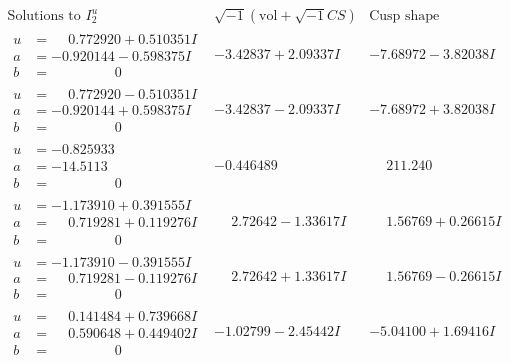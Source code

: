 \documentclass[1p]{elsarticle_modified}
\theoremstyle{definition}
\newcommand{\I}{\sqrt{-1}}
\begin{document}
$$\begin{array}{c|c|c}  
\text{Solutions to }I^u_{2}& \I (\text{vol} + \sqrt{-1}CS) & \text{Cusp shape}\\
 \hline 
\begin{aligned}
u &= \phantom{-}0.772920 + 0.510351 I \\
a &= -0.920144 - 0.598375 I \\
b &= \phantom{-0.000000 } 0\end{aligned}
 & -3.42837 + 2.09337 I & -7.68972 - 3.82038 I \\ \hline\begin{aligned}
u &= \phantom{-}0.772920 - 0.510351 I \\
a &= -0.920144 + 0.598375 I \\
b &= \phantom{-0.000000 } 0\end{aligned}
 & -3.42837 - 2.09337 I & -7.68972 + 3.82038 I \\ \hline\begin{aligned}
u &= -0.825933\phantom{ +0.000000I} \\
a &= -14.5113\phantom{ +0.000000I} \\
b &= \phantom{-0.000000 } 0\end{aligned}
 & -0.446489\phantom{ +0.000000I} & \phantom{-}211.240\phantom{ +0.000000I} \\ \hline\begin{aligned}
u &= -1.173910 + 0.391555 I \\
a &= \phantom{-}0.719281 + 0.119276 I \\
b &= \phantom{-0.000000 } 0\end{aligned}
 & \phantom{-}2.72642 - 1.33617 I & \phantom{-}1.56769 + 0.26615 I \\ \hline\begin{aligned}
u &= -1.173910 - 0.391555 I \\
a &= \phantom{-}0.719281 - 0.119276 I \\
b &= \phantom{-0.000000 } 0\end{aligned}
 & \phantom{-}2.72642 + 1.33617 I & \phantom{-}1.56769 - 0.26615 I \\ \hline\begin{aligned}
u &= \phantom{-}0.141484 + 0.739668 I \\
a &= \phantom{-}0.590648 + 0.449402 I \\
b &= \phantom{-0.000000 } 0\end{aligned}
 & -1.02799 - 2.45442 I & -5.04100 + 1.69416 I \\ \hline\begin{aligned}

\end{aligned}
\end{array}$$
\end{document}
